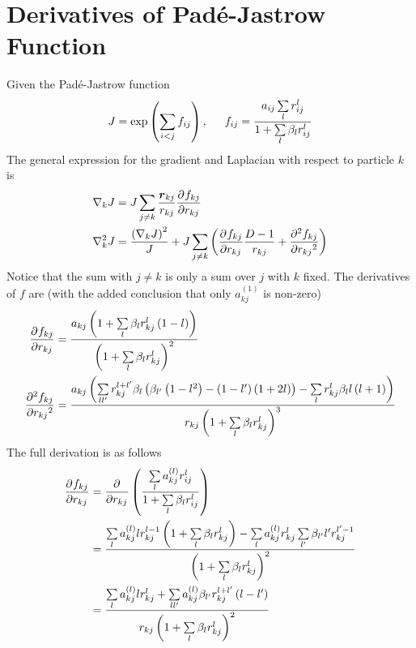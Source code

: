 \section{Derivatives of Pad\'e-Jastrow Function}
    Given the Pad\'e-Jastrow function
        \begin{equation}
            J = \exp\left(\sum\limits_{i<j}f_{ij}\right) ,\indent f_{ij} =
            \frac{a_{ij}\sum\limits_l r^l_{ij}}{1 + \sum\limits_l \beta_l
            r^l_{ij}}
        \end{equation}
    The general expression for the gradient and Laplacian with respect to
    particle $k$ is
        \begin{equation}
            \begin{aligned}
                \nabla_k J &= J\sum_{j\neq k} \frac{\blds{r}_{kj}}{r_{kj}}
                \prd{r_{kj}}[f_{kj}] \\
                \nabla^2_k J &= \frac{\left(\nabla_k J\right)^2}{J} +
                J\sum_{j\neq k} \left(\prd{r_{kj}}[f_{kj}] \frac{D-1}{r_{kj}} +
                \prd{r_{kj}}[f_{kj}][2]\right)
            \end{aligned}
        \end{equation}
    Notice that the sum with $j\neq k$ is only a sum over $j$ with $k$ fixed.
    The derivatives of $f$ are (with the added conclusion that only
    $a^{(1)}_{kj}$ is non-zero)
        \begin{equation}
            \begin{aligned}
                \prd{r_{kj}}[f_{kj}] &= \frac{a_{kj}\left(1 +
                \sumll{l}\beta_lr^l_{kj}\left(1-l\right)\right)}{\left(1 +
                \sumll{l}\beta_lr^l_{kj}\right)^2} \\
                \prd{r_{kj}}[f_{kj}][2] &=
                \frac{a_{kj}\left(\sumll{ll'}r^{l+l'}_{kj}\beta_l
                \left(\beta_{l'}\left(1-l^2\right) -
                \left(1-l'\right)\left(1+2l\right)\right) -
                \sumll{l}r^l_{kj}\beta_ll\left(l+1\right)\right)}{r_{kj}\left(1
                + \sumll{l}\beta_lr^l_{kj}\right)^3}
            \end{aligned}
        \end{equation}
    The full derivation is as follows
        \begin{align}
            \prd{r_{kj}}[f_{kj}] &= \prd{r_{kj}} \left(\frac{\sum\limits_l
            a^{(l)}_{kj}r^l_{ij}}{1 + \sum\limits_l \beta_l r^l_{ij}}\right)
            \nonumber \\
            &= \frac{\sum\limits_la^{(l)}_{kj}lr^{l-1}_{kj}\left(1 +
            \sum\limits_l \beta_l r^l_{kj}\right) - \sum\limits_l
            a^{(l)}_{kj}r^l_{kj}
            \sum\limits_{l'}\beta_{l'}l'r^{l'-1}_{kj}}{\left(1 +
            \sum\limits_l\beta_lr^l_{kj}\right)^2} \nonumber \\ 
            &= \frac{\sum\limits_l a^{(l)}_{kj}lr^l_{kj} +
            \sum\limits_{ll'}a^{(l)}_{kj}\beta_{l'}r^{l+l'}_{kj}
            \left(l-l'\right)}{r_{kj}\left(1 +
            \sum\limits_l\beta_lr^l_{kj}\right)^2} 
        \end{align}
